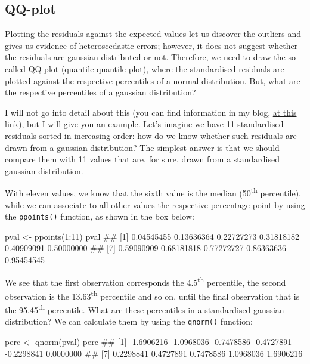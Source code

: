 \documentclass[a4paper,12pt,oneside]{book}
\newenvironment{Shaded}{\begin{snugshade}}{\end{snugshade}}
\newcommand{\DecValTok}[1]{#1}
\newcommand{\SpecialCharTok}[1]{#1}
\newcommand{\DocumentationTok}[1]{#1}
\newcommand{\OtherTok}[1]{#1}
\newcommand{\FunctionTok}[1]{#1}
\newcommand{\NormalTok}[1]{#1}
\begin{document}
\hypertarget{qq-plot}{%
\subsection{QQ-plot}\label{qq-plot}}

Plotting the residuals against the expected values let us discover the outliers and gives us evidence of heteroscedastic errors; however, it does not suggest whether the residuals are gaussian distributed or not. Therefore, we need to draw the so-called QQ-plot (quantile-quantile plot), where the standardised residuals are plotted against the respective percentiles of a normal distribution. But, what are the respective percentiles of a gaussian distribution?

I will not go into detail about this (you can find information in my blog, \href{https://www.statforbiology.com/2020/stat_general_percentiles/}{at this link}), but I will give you an example. Let's imagine we have 11 standardised residuals sorted in increasing order: how do we know whether such residuals are drawn from a gaussian distribution? The simplest answer is that we should compare them with 11 values that are, for sure, drawn from a standardised gaussian distribution.

With eleven values, we know that the sixth value is the median (50\textsuperscript{th} percentile), while we can associate to all other values the respective percentage point by using the \texttt{ppoints()} function, as shown in the box below:

\begin{Shaded}
\begin{Highlighting}[]
\NormalTok{pval }\OtherTok{\textless{}{-}} \FunctionTok{ppoints}\NormalTok{(}\DecValTok{1}\SpecialCharTok{:}\DecValTok{11}\NormalTok{)}
\NormalTok{pval}
\DocumentationTok{\#\#  [1] 0.04545455 0.13636364 0.22727273 0.31818182 0.40909091 0.50000000}
\DocumentationTok{\#\#  [7] 0.59090909 0.68181818 0.77272727 0.86363636 0.95454545}
\end{Highlighting}
\end{Shaded}

We see that the first observation corresponds the 4.5\textsuperscript{th} percentile, the second observation is the 13.63\textsuperscript{th} percentile and so on, until the final observation that is the 95.45\textsuperscript{th} percentile. What are these percentiles in a standardised gaussian distribution? We can calculate them by using the \texttt{qnorm()} function:

\begin{Shaded}
\begin{Highlighting}[]
\NormalTok{perc }\OtherTok{\textless{}{-}} \FunctionTok{qnorm}\NormalTok{(pval)}
\NormalTok{perc}
\DocumentationTok{\#\#  [1] {-}1.6906216 {-}1.0968036 {-}0.7478586 {-}0.4727891 {-}0.2298841  0.0000000}
\DocumentationTok{\#\#  [7]  0.2298841  0.4727891  0.7478586  1.0968036  1.6906216}
\end{Highlighting}
\end{Shaded}
\end{document}
